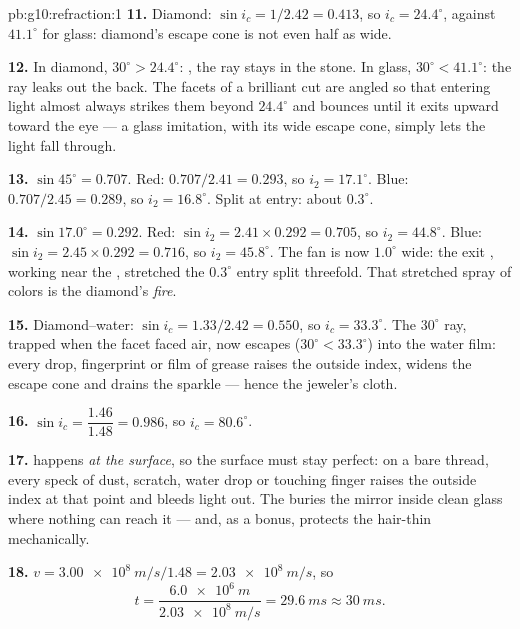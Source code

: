 \begin{solution}{pb:g10:refraction:1}
\textbf{11.} Diamond: $\sin i_c = 1/2.42 = 0.413$, so
$i_c = 24.4^\circ$, against $41.1^\circ$ for glass: diamond's escape
cone is not even half as wide.

\textbf{12.} In diamond, $30^\circ > 24.4^\circ$: , the ray stays in the stone. In glass,
$30^\circ < 41.1^\circ$: the ray leaks out the back. The facets of a
brilliant cut are angled so that entering light almost always strikes
them beyond $24.4^\circ$ and bounces until it exits upward toward the
eye --- a glass imitation, with its wide escape cone, simply lets the
light fall through.

\textbf{13.} $\sin 45^\circ = 0.707$. Red: $0.707/2.41 = 0.293$, so
$i_2 = 17.1^\circ$. Blue: $0.707/2.45 = 0.289$, so $i_2 = 16.8^\circ$.
Split at entry: about $0.3^\circ$.

\textbf{14.} $\sin 17.0^\circ = 0.292$. Red: $\sin i_2 = 2.41 \times
0.292 = 0.705$, so $i_2 = 44.8^\circ$. Blue: $\sin i_2 = 2.45 \times
0.292 = 0.716$, so $i_2 = 45.8^\circ$. The fan is now $1.0^\circ$
wide: the exit , working near the , stretched
the $0.3^\circ$ entry split threefold. That stretched spray of colors
is the diamond's \emph{fire}.

\textbf{15.} Diamond--water: $\sin i_c = 1.33/2.42 = 0.550$, so
$i_c = 33.3^\circ$. The $30^\circ$ ray, trapped when the facet faced
air, now escapes ($30^\circ < 33.3^\circ$) into the water film: every
drop, fingerprint or film of grease raises the outside index, widens
the escape cone and drains the sparkle --- hence the jeweler's cloth.

\textbf{16.} $\sin i_c = \dfrac{1.46}{1.48} = 0.986$, so
$i_c = 80.6^\circ$.

\textbf{17.}  happens \emph{at the surface},
so the surface must stay perfect: on a bare thread, every speck of
dust, scratch, water drop or touching finger raises the outside index
at that point and bleeds light out. The  buries the mirror
inside clean glass where nothing can reach it --- and, as a bonus,
protects the hair-thin  mechanically.

\textbf{18.} $v = \qty{3.00e8}{m/s}/1.48 = \qty{2.03e8}{m/s}$, so
\[
t = \frac{\qty{6.0e6}{m}}{\qty{2.03e8}{m/s}} = \qty{29.6}{ms} \approx
\qty{30}{ms}.
\]


\end{solution}
